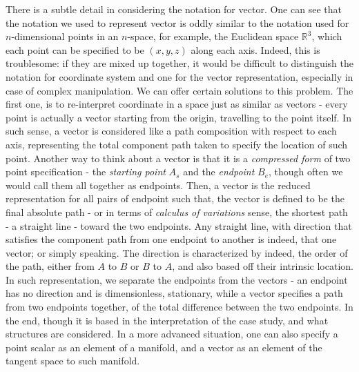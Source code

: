 There is a subtle detail in considering the notation for vector. One can see that the notation we used to represent vector is oddly similar to the notation used for $n$-dimensional points in an $n$-space, for example, the Euclidean space $\mathbb{R}^{3}$, which each point can be specified to be $(x,y,z)$ along each axis. Indeed, this is troublesome: if they are mixed up together, it would be difficult to distinguish the notation for coordinate system and one for the vector representation, especially in case of complex manipulation. We can offer certain solutions to this problem. The first one, is to re-interpret coordinate in a space just as similar as vectors - every point is actually a vector starting from the origin, travelling to the point itself. In such sense, a vector is considered like a path composition with respect to each axis, representing the total component path taken to specify the location of such point. Another way to think about a vector is that it is a \textit{compressed form} of two point specification - the \textit{starting point} $A_{s}$ and the \textit{endpoint} $B_{e}$, though often we would call them all together as endpoints. Then, a vector is the reduced representation for all pairs of endpoint such that, the vector is defined to be the final absolute path - or in terms of \textit{calculus of variations} sense, the shortest path - a straight line - toward the two endpoints. Any straight line, with direction that satisfies the component path from one endpoint to another is indeed, that one vector; or simply speaking. The direction is characterized by indeed, the order of the path, either from $A$ to $B$ or $B$ to $A$, and also based off their intrinsic location. In such representation, we separate the endpoints from the vectors - an endpoint has no direction and is dimensionless, stationary, while a vector specifies a path from two endpoints together, of the total difference between the two endpoints. In the end, though it is based in the interpretation of the case study, and what structures are considered. In a more advanced situation, one can also specify a point scalar as an element of a manifold, and a vector as an element of the tangent space to such manifold. 

